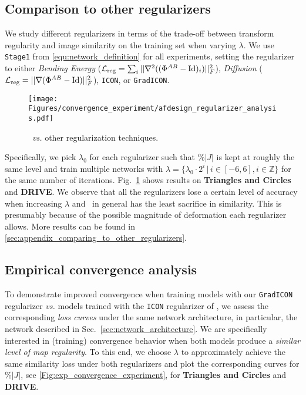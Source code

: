 \subsection{Comparison to other regularizers}
\label{subsection:regularizercomp}
\vspace{-0.15cm}
We study different regularizers in terms of the trade-off between transform regularity and image similarity on the training set when varying $\lambda$. We use \texttt{Stage1} from \ref{equ:network_definition} for all experiments, setting the regularizer to either \emph{Bending Energy} ($\mathcal{L}_{\text{reg}} = \sum_i||\nabla ^2((\Phi^{AB} - \operatorname{Id})_i)||_F^2$), \emph{Diffusion} ($\mathcal{L}_{\text{reg}} = || \nabla (\Phi^{AB} - \operatorname{Id})||_F^2$), \texttt{ICON}, or \texttt{GradICON}.
\begin{figure}[htp!]
	\centering
	\texttt{[image: Figures/convergence\_experiment/afdesign\_regularizer\_analysis.pdf]}
	\caption{\gradicon~\emph{vs.} other regularization techniques.
		\label{Fig:exp_comp_regularizer_with_varying_lambda}}
	\vspace{-0.25cm}
\end{figure}
Specifically, we pick $\lambda_0$ for each regularizer such that $\%|J|$ is kept at roughly the same level and train multiple networks with $\lambda=\{\lambda_0\cdot 2^i\,|\, i \in [-6,6], i\in \mathbb{Z}\}$ for the same number of iterations. Fig.~\ref{Fig:exp_comp_regularizer_with_varying_lambda} shows results on {\bf Triangles and Circles} and {\bf DRIVE}. We observe that all the regularizers lose a certain level of accuracy when increasing $\lambda$ and \gradicon~in general has the least sacrifice in similarity. This is presumably because of the possible magnitude of deformation each regularizer allows. More results can be found in
\ref{sec:appendix_comparing_to_other_regularizers}.

\vspace{-0.15cm}
\subsection{Empirical convergence analysis} \label{sec:exp_convergence_toy_demo}
\vspace{-0.15cm}
To demonstrate improved convergence when training models with our
\texttt{GradICON} regularizer \emph{vs.} models trained with the \texttt{ICON}
regularizer of \cite{greer2021icon}, we assess the corresponding \emph{loss
	curves} under the same network architecture, in particular, the network
described in Sec.~\ref{sec:network_architecture}. We are specifically
interested in (training) convergence behavior when both models produce a
\emph{similar level of map regularity}. To this end, we choose $\lambda$ to
approximately achieve the same similarity loss under both regularizers and
plot the corresponding curves for $\%|J|$, see
\ref{Fig:exp_convergence_experiment}, for \textbf{Triangles and Circles} and
\textbf{DRIVE}.

